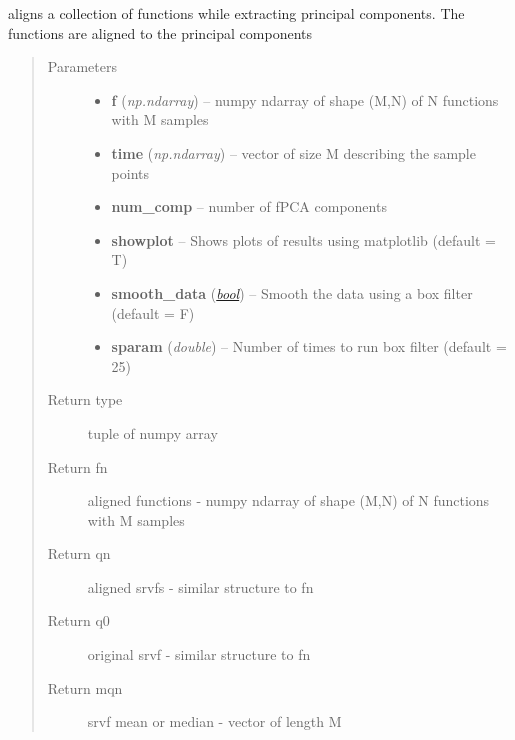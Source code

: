 \documentclass[letterpaper,10pt,english]{sphinxmanual}
\begin{document}
\begin{fulllineitems}
\label{time_warping:time_warping.align_fPCA}
aligns a collection of functions while extracting principal components.
The functions are aligned to the principal components
\begin{quote}\begin{description}
\item[{Parameters}] \leavevmode\begin{itemize}
\item {} 
\textbf{f} (\emph{np.ndarray}) -- numpy ndarray of shape (M,N) of N functions with M samples

\item {} 
\textbf{time} (\emph{np.ndarray}) -- vector of size M describing the sample points

\item {} 
\textbf{num\_comp} -- number of fPCA components

\item {} 
\textbf{showplot} -- Shows plots of results using matplotlib (default = T)

\item {} 
\textbf{smooth\_data} (\href{http://docs.python.org/library/functions.html\#bool}{\emph{bool}}) -- Smooth the data using a box filter (default = F)

\item {} 
\textbf{sparam} (\emph{double}) -- Number of times to run box filter (default = 25)

\end{itemize}

\item[{Return type}] \leavevmode
tuple of numpy array

\item[{Return fn}] \leavevmode
aligned functions - numpy ndarray of shape (M,N) of N
functions with M samples

\item[{Return qn}] \leavevmode
aligned srvfs - similar structure to fn

\item[{Return q0}] \leavevmode
original srvf - similar structure to fn

\item[{Return mqn}] \leavevmode
srvf mean or median - vector of length M


\end{description}
\end{quote}
\end{fulllineitems}
\end{document}

